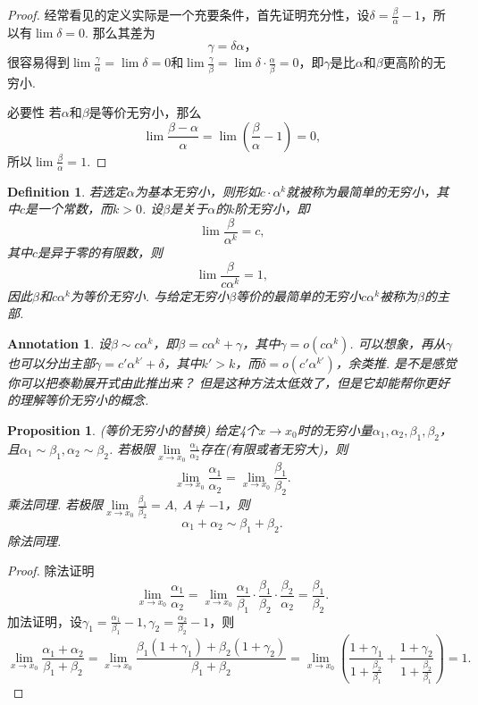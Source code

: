 \documentclass{article}
\newtheorem{proposition}[theorem]{Proposition}
\newtheorem{definition}[theorem]{Definition}
\newtheorem{annotation}[theorem]{Annotation}
\begin{document}
\begin{proof}
经常看见的定义实际是一个充要条件，首先证明{\color{blue}充分性}，设$\delta = \frac{\beta}{\alpha} - 1$，所以有$\lim \delta = 0$. 那么其差为
$$
\gamma = \delta \alpha，
$$
很容易得到$\lim \frac{\gamma}{\alpha} =\lim \delta = 0$和$\lim \frac{\gamma}{\beta} = \lim \delta\cdot\frac{\alpha}{\beta} = 0$，即$\gamma$是比$\alpha$和$\beta$更高阶的无穷小.

{\color{blue}必要性} 若$\alpha$和$\beta$是等价无穷小，那么
$$
\lim \frac{\beta-\alpha}{\alpha} = \lim (\frac{\beta}{\alpha} - 1) = 0,
$$
所以$\lim \frac{\beta}{\alpha} = 1$.
\end{proof}


\begin{definition}
\rm 若选定$\alpha$为基本无穷小，则形如$c\cdot \alpha^k$就被称为{\color{red}最简单的无穷小}，其中$c$是一个常数，而$k > 0$. 设$\beta$是关于$\alpha$的$k$阶无穷小，即
$$
\lim \frac{\beta}{\alpha^k} = c,
$$
其中$c$是异于零的有限数，则
$$
\lim \frac{\beta}{c\alpha^k} = 1,
$$
因此$\beta$和$c\alpha^k$为等价无穷小. 与给定无穷小$\beta$等价的最简单的无穷小$c\alpha^k$被称为$\beta$的{\color{red}主部}.
\end{definition}

\begin{annotation}
\rm 设$\beta \sim c\alpha^k$，即$\beta = c\alpha^k + \gamma$，其中$\gamma = o(c\alpha^k)$. 可以想象，再从$\gamma$也可以分出主部$\gamma = c'\alpha^{k'} + \delta$，其中$k' > k$，而$\delta = o(c'\alpha^{k'})$，余类推. {\color{blue}是不是感觉你可以把泰勒展开式由此推出来？ 但是这种方法太低效了，但是它却能帮你更好的理解等价无穷小的概念}.
\end{annotation}

\begin{proposition}
\rm {\color{red} (等价无穷小的替换) }给定4个$x \rightarrow x_0$时的无穷小量$\alpha_1,\alpha_2,\beta_1,\beta_2$，且$\alpha_1 \sim \beta_1, \alpha_2 \sim \beta_2$. 若极限$\lim\limits_{x \rightarrow x_0} \frac{\alpha_1}{\alpha_2}$存在(有限或者无穷大)，则
$$
\lim\limits_{x \rightarrow x_0} \frac{\alpha_1}{\alpha_2} = \lim\limits_{x \rightarrow x_0} \frac{\beta_1}{\beta_2}.
$$
乘法同理. 若极限$\lim\limits_{x \rightarrow x_0} \frac{\beta_1}{\beta_2} = A, \; A \neq -1$，则
$$
\alpha_1 + \alpha_2 \sim \beta_1 + \beta_2.
$$ 
除法同理.
\end{proposition}

\begin{proof}
除法证明
$$
\lim\limits_{x \rightarrow x_0} \frac{\alpha_1}{\alpha_2}= \lim\limits_{x \rightarrow x_0} \frac{\alpha_1}{\beta_1} \cdot \frac{\beta_1}{\beta_2} \cdot \frac{\beta_2}{\alpha_2} = \frac{\beta_1}{\beta_2}. 
$$
加法证明，设$\gamma_1 = \frac{\alpha_1}{\beta_1} - 1,\gamma_2 = \frac{\alpha_2}{\beta_2} - 1$，则
$$
\lim\limits_{x \rightarrow x_0} \frac{\alpha_1+\alpha_2}{\beta_1 + \beta_2} = \lim\limits_{x \rightarrow x_0} \frac{\beta_1(1+\gamma_1) + \beta_2(1+\gamma_2)}{\beta_1 + \beta_2} = \lim\limits_{x \rightarrow x_0} \left( \frac{1+\gamma_1}{1+\frac{\beta_2}{\beta_1}} + \frac{1+\gamma_2}{1+\frac{\beta_2}{\beta_1}} \right) = 1. 
$$
\end{proof}
\end{document}
